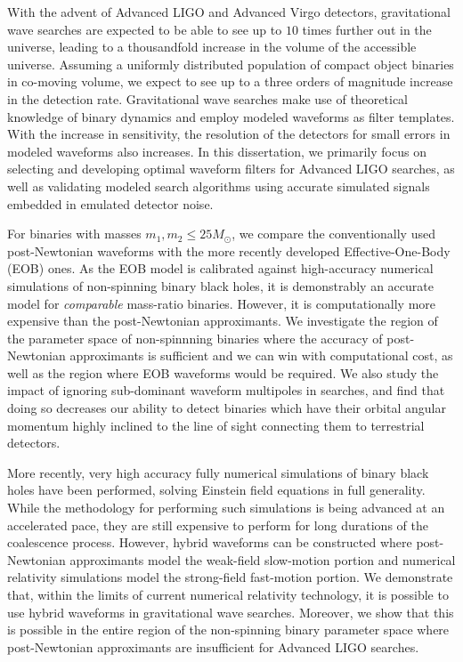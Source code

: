 
With the advent of Advanced LIGO and Advanced Virgo detectors, 
gravitational wave searches are expected to be able to see up to $10$
times further out in the universe, leading to a thousandfold increase in 
the volume of the accessible universe. Assuming a uniformly 
distributed population of compact object binaries in co-moving volume, 
we expect to see up to a three orders of magnitude increase in the detection 
rate. Gravitational wave searches make use of theoretical knowledge of
binary dynamics and employ modeled waveforms as filter templates.
With the increase in sensitivity, the resolution of the detectors 
for small errors in modeled waveforms also increases. In this dissertation,
we primarily focus on selecting and developing optimal waveform filters
for Advanced LIGO searches, as well as validating modeled search algorithms
using accurate simulated signals embedded in emulated detector noise.

For binaries with masses $m_1,m_2\leq 25M_\odot$, we compare the 
conventionally used post-Newtonian waveforms with the more recently 
developed Effective-One-Body (EOB) ones. As the EOB model is calibrated
against high-accuracy numerical simulations of non-spinning binary 
black holes, it is demonstrably an accurate model for {\it comparable}
mass-ratio binaries. However, it is computationally more expensive
than the post-Newtonian approximants. 
We investigate the region of the parameter
space of non-spinnning binaries where the accuracy of post-Newtonian
approximants is sufficient and we can win with computational cost, as
well as the region where EOB waveforms would be required. We also
study the impact of ignoring sub-dominant waveform multipoles in 
searches, and find that doing so decreases our ability to detect binaries
which have their orbital angular momentum highly inclined to the 
line of sight connecting them to terrestrial detectors.

More recently, very high accuracy fully numerical simulations of 
binary black holes have been performed, solving Einstein field equations
in full generality. While the methodology for performing such simulations
is being advanced at an accelerated pace, they are still expensive to 
perform for long durations of the coalescence process. However, hybrid
waveforms can be constructed where post-Newtonian approximants model the 
weak-field slow-motion portion and numerical relativity simulations 
model the strong-field fast-motion portion. We demonstrate that, within the 
limits of current numerical relativity technology, 
it is possible to use hybrid waveforms
in gravitational wave searches. Moreover, we show that this is possible in 
the entire region of the non-spinning binary parameter space where
post-Newtonian approximants are insufficient for Advanced LIGO searches.

